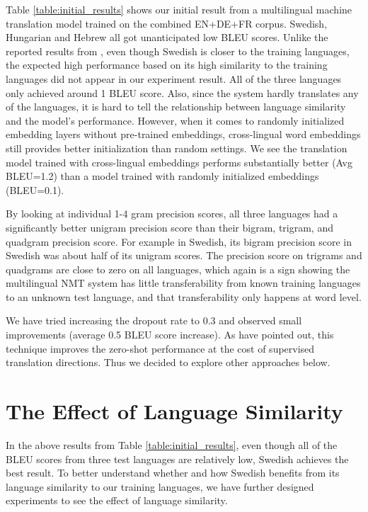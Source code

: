 \documentclass[thesis,fonts=libertine]{cluu}
\begin{document}
Table \ref{table:initial_results} shows our initial result from a multilingual machine translation model trained on the combined EN+DE+FR corpus. Swedish, Hungarian and Hebrew all got unanticipated low BLEU scores. Unlike the reported results from \textcite{Qi:2018aa}, even though Swedish is closer to the training languages, the expected high performance based on its high similarity to the training languages did not appear in our experiment result. All of the three languages only achieved around 1 BLEU score. Also, since the system hardly translates any of the languages, it is hard to tell the relationship between language similarity and the model's performance. However, when it comes to randomly initialized embedding layers without pre-trained embeddings, cross-lingual word embeddings still provides better initialization than random settings. We see the translation model trained with cross-lingual embeddings performs substantially better (Avg BLEU=1.2) than a model trained with randomly initialized embeddings (BLEU=0.1).

By looking at individual 1-4 gram precision scores, all three languages had a significantly better unigram precision score than their bigram, trigram, and quadgram precision score. For example in Swedish, its bigram precision score in Swedish was about half of its unigram scores. The precision score on trigrams and quadgrams are close to zero on all languages, which again is a sign showing the multilingual NMT system has little transferability from known training languages to an unknown test language, and that transferability only happens at word level.

We have tried increasing the dropout rate to 0.3 and observed small improvements (average 0.5 BLEU score increase). As \textcite{Arivazhagan:2019aa} have pointed out, this technique improves the zero-shot performance at the cost of supervised translation directions. Thus we decided to explore other approaches below.

\section{The Effect of Language Similarity}
\label{sec:langauge_similarity}

In the above results from Table \ref{table:initial_results}, even though all of the BLEU scores from three test languages are relatively low, Swedish achieves the best result. To better understand whether and how Swedish benefits from its language similarity to our training languages, we have further designed experiments to see the effect of language similarity.
\end{document}
